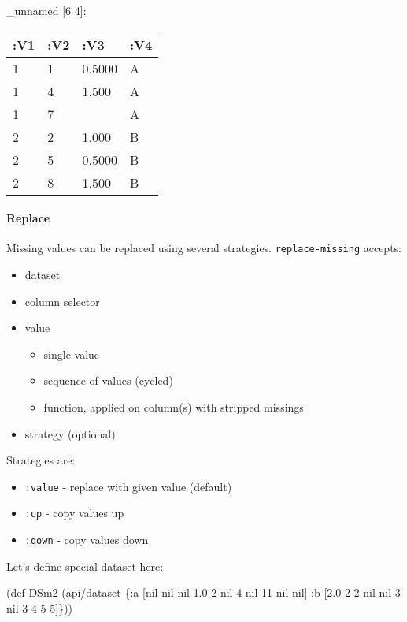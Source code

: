 \documentclass[]{article}
\newenvironment{Shaded}{\begin{snugshade}}{\end{snugshade}}
\newcommand{\DecValTok}[1]{\textcolor[rgb]{0.00,0.00,0.81}{#1}}
\newcommand{\FloatTok}[1]{\textcolor[rgb]{0.00,0.00,0.81}{#1}}
\newcommand{\FunctionTok}[1]{\textcolor[rgb]{0.00,0.00,0.00}{#1}}
\newcommand{\VariableTok}[1]{\textcolor[rgb]{0.00,0.00,0.00}{#1}}
\newcommand{\BuiltInTok}[1]{#1}
\newcommand{\AttributeTok}[1]{\textcolor[rgb]{0.77,0.63,0.00}{#1}}
\newcommand{\NormalTok}[1]{#1}
\providecommand{\tightlist}{%
  \setlength{\itemsep}{0pt}\setlength{\parskip}{0pt}}
\let\oldparagraph\paragraph
\renewcommand{\paragraph}[1]{\oldparagraph{#1}\mbox{}}
\begin{document}
\_unnamed {[}6 4{]}:

\begin{longtable}[]{@{}llll@{}}
\toprule
:V1 & :V2 & :V3 & :V4\tabularnewline
\midrule
\endhead
1 & 1 & 0.5000 & A\tabularnewline
1 & 4 & 1.500 & A\tabularnewline
1 & 7 & & A\tabularnewline
2 & 2 & 1.000 & B\tabularnewline
2 & 5 & 0.5000 & B\tabularnewline
2 & 8 & 1.500 & B\tabularnewline
\bottomrule
\end{longtable}

\paragraph{Replace}\label{replace}

Missing values can be replaced using several strategies.
\texttt{replace-missing} accepts:

\begin{itemize}
\tightlist
\item
  dataset
\item
  column selector
\item
  value

  \begin{itemize}
  \tightlist
  \item
    single value
  \item
    sequence of values (cycled)
  \item
    function, applied on column(s) with stripped missings
  \end{itemize}
\item
  strategy (optional)
\end{itemize}

Strategies are:

\begin{itemize}
\tightlist
\item
  \texttt{:value} - replace with given value (default)
\item
  \texttt{:up} - copy values up
\item
  \texttt{:down} - copy values down
\end{itemize}

Let's define special dataset here:

\begin{Shaded}
\begin{Highlighting}[]
\NormalTok{(}\BuiltInTok{def}\FunctionTok{ DSm2 }\NormalTok{(api/dataset \{}\AttributeTok{:a}\NormalTok{ [}\VariableTok{nil} \VariableTok{nil} \VariableTok{nil} \FloatTok{1.0} \DecValTok{2}   \VariableTok{nil} \DecValTok{4}   \VariableTok{nil}  \DecValTok{11} \VariableTok{nil} \VariableTok{nil}\NormalTok{]}
                        \AttributeTok{:b}\NormalTok{ [}\FloatTok{2.0}   \DecValTok{2}   \DecValTok{2} \VariableTok{nil} \VariableTok{nil} \DecValTok{3}   \VariableTok{nil}   \DecValTok{3}  \DecValTok{4}  \DecValTok{5} \DecValTok{5}\NormalTok{]\}))}
\end{Highlighting}
\end{Shaded}
\end{document}
